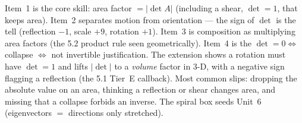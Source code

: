 \documentclass[10pt]{article}
\begin{document}
\begin{teachernote}
Item~1 is the core skill: area factor $=|\det A|$ (including a shear, $\det=1$, that keeps area). Item~2
separates motion from orientation --- the sign of $\det$ is the tell (reflection $-1$, scale $+9$,
rotation $+1$). Item~3 is composition as multiplying area factors (the 5.2 product rule seen
geometrically). Item~4 is the $\det=0\Leftrightarrow$ collapse $\Leftrightarrow$ not invertible
justification. The extension shows a rotation must have $\det=1$ and lifts $|\det|$ to a \emph{volume}
factor in 3-D, with a negative sign flagging a reflection (the 5.1 Tier~E callback). Most common slips:
dropping the absolute value on an area, thinking a reflection or shear changes area, and missing that a
collapse forbids an inverse. The spiral box seeds Unit~6 (eigenvectors $=$ directions only stretched).
\end{teachernote}
\end{document}
